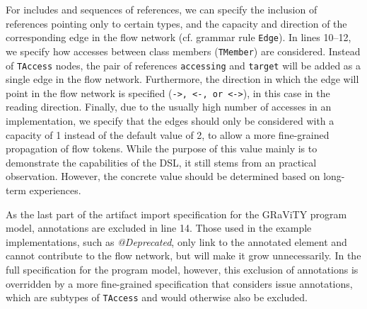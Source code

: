 %
%


For includes and sequences of references, we can specify the inclusion of references pointing only to certain types, and the capacity and direction of the corresponding edge in the flow network (cf. grammar rule \texttt{Edge}).
In lines 10--12, we specify how accesses between class members (\texttt{TMember}) are considered.
Instead of \texttt{TAccess} nodes, the pair of references \texttt{accessing} and \texttt{target} will be added as a single edge in the flow network.
Furthermore, the direction in which the edge will point in the flow network is specified (\texttt{->, <-, or <->}), in this case in the reading direction.
Finally, due to the usually high number of accesses in an implementation, we specify that the edges should only be considered with a capacity of 1 instead of the default value of 2, to allow a more fine-grained propagation of flow tokens.
While the purpose of this value mainly is to demonstrate the capabilities of the DSL, it still stems from an practical observation.
However, the concrete value should be determined based on long-term experiences.


As the last part of the artifact import specification for the GRaViTY program model, annotations are excluded in line 14.
Those used in the example implementations, such as \textit{@Deprecated}, only link to the annotated element and cannot contribute to the flow network, but will make it grow unnecessarily.
In the full specification for the program model, however, this exclusion of annotations is overridden by a more fine-grained specification that considers issue annotations, which are subtypes of \texttt{TAccess} and would otherwise also be excluded.


